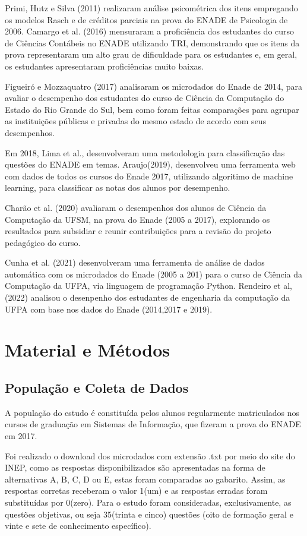 \documentclass[12pt]{article}
\begin{document}
 Primi, Hutz e Silva (2011) realizaram análise psicométrica dos itens empregando os modelos Rasch e de créditos parciais na prova do ENADE de Psicologia de 2006. Camargo et al. (2016) mensuraram a proficiência dos estudantes do curso de Ciências Contábeis no ENADE utilizando TRI, demonstrando que os itens da prova representaram um alto grau de dificuldade para os estudantes e, em geral, os estudantes apresentaram proficiências muito baixas.

\newpage
Figueiró e Mozzaquatro (2017) analisaram os microdados do Enade de 2014, para avaliar o desempenho dos estudantes do curso de Ciência da
Computação do Estado do Rio Grande do Sul, bem como foram feitas comparações para
agrupar as instituições públicas e privadas do mesmo estado de acordo com seus
desempenhos.

Em 2018, Lima et al., desenvolveram uma metodologia para classificação das questões do ENADE em temas. Araujo(2019), desenvolveu uma ferramenta web com dados de todos os cursos do Enade 2017, utilizando algoritimo de machine learning, para classificar as notas dos alunos por desempenho.

Charão et al. (2020) avaliaram o desempenhos dos alunos de Ciência da Computação da UFSM, na prova do Enade (2005 a 2017), explorando os resultados para subsidiar e reunir contribuições para a revisão do projeto pedagógico do curso. 

Cunha et al. (2021) desenvolveram uma ferramenta de análise de dados automática com os microdados do Enade (2005 a 201) para o curso de Ciência da Computação da UFPA, via linguagem de programação Python. Rendeiro et al, (2022) analisou o desenpenho dos estudantes de engenharia da computação da UFPA com base nos dados do Enade (2014,2017 e 2019).




\section{Material e Métodos}
\subsection{População e Coleta de Dados}

A população do estudo é constituída pelos alunos regularmente matriculados nos cursos de graduação em Sistemas de Informação, que fizeram a prova do ENADE em 2017. 

Foi realizado o download dos microdados com extensão .txt por meio do site do INEP, como as respostas disponibilizados são apresentadas na forma de alternativas A, B, C, D ou E, estas foram comparadas ao gabarito. Assim, as respostas corretas receberam o valor 1(um) e as respostas erradas foram substituídas por 0(zero). Para o estudo foram consideradas, exclusivamente, as questões objetivas, ou seja 35(trinta e cinco) questões (oito de formação geral e vinte e sete de conhecimento específico).
\end{document}
